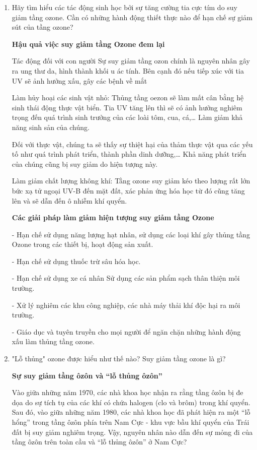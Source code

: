 \begin{enumerate}[label=\bfseries Câu \arabic*:]
{	}
	\item {}
	
	
	{
		Hãy tìm hiểu các tác động sinh học bởi sự tăng cường tia cực tím do suy giảm tầng ozone. Cần có những hành động thiết thực nào để hạn chế sự giảm sút của tầng ozone?
	}
	
	\hideall
	{
		\textbf{Hậu quả việc suy giảm tầng Ozone đem lại}
		
		Tác động đối với con người
		Sự suy giảm tầng ozon chính là nguyên nhân gây ra ung thư da, hình thành khối u ác tính. Bên cạnh đó nếu tiếp xúc với tia UV sẽ ảnh hưởng xấu, gây các bệnh về mắt
		
		Làm hủy hoại các sinh vật nhỏ: Thủng tầng oezon sẽ làm mất cân bằng hệ sinh thái động thực vật biển. Tia UV tăng lên thì sẽ có ảnh hưởng nghiêm trọng đến quá trình sinh trưởng của các loài tôm, cua, cá,… Làm giảm khả năng sinh sản của chúng.
		
		Đối với thực vật, chúng ta sẽ thấy sự thiệt hại của thảm thực vật qua các yếu tố như quá trình phát triển, thành phần dinh dưỡng,… Khả năng phát triển của chúng cũng bị suy giảm do hiện tượng này.
		
		Làm giảm chất lượng không khí: Tầng ozone suy giảm kéo theo lượng rất lớn bức xạ tử ngoại UV-B đến mặt đất, xác phản ứng hóa học từ đó cũng tăng lên và sẽ dẫn đến ô nhiễm khí quyển.
		
		\textbf{Các giải pháp làm giảm hiện tượng suy giảm tầng Ozone}
		
		- Hạn chế sử dụng năng lượng hạt nhân, sử dụng các loại khí gây thủng tầng Ozone trong các thiết bị, hoạt động sản xuất.
		
		- Hạn chế sử dụng thuốc trừ sâu hóa học.
		
		- Hạn chế sử dụng xe cá nhân
		Sử dụng các sản phẩm sạch thân thiện môi trường.
		
		- Xử lý nghiêm các khu công nghiệp, các nhà máy thải khí độc hại ra môi trường.
		
		- Giáo dục và tuyên truyền cho mọi người để ngăn chặn những hành động xấu làm thủng tầng ozone.
	}
	\item {}
	
	
	{
		"Lỗ thủng" ozone được hiểu như thế nào? Suy giảm tầng ozone là gì?
	}
	
	\hideall
	{
		\textbf{Sự suy giảm tầng ôzôn và “lỗ thủng ôzôn”}
		
		Vào giữa những năm 1970, các nhà khoa học nhận ra rằng tầng ôzôn bị đe dọa do sự tích tụ của các khí có chứa halogen (clo và brôm) trong khí quyển. Sau đó, vào giữa những năm 1980, các nhà khoa học đã phát hiện ra một “lỗ hổng” trong tầng ôzôn phía trên Nam Cực - khu vực bầu khí quyển của Trái đất bị suy giảm nghiêm trọng.
		Vậy, nguyên nhân nào dẫn đến sự mỏng đi của tầng ôzôn trên toàn cầu và “lỗ thủng ôzôn” ở Nam Cực?
		
}
\end{enumerate}
